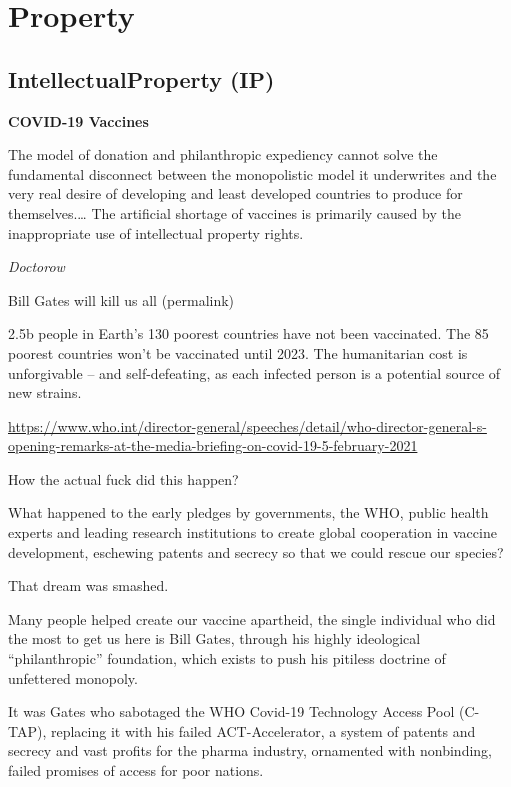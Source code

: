 \documentclass[
]{book}
\begin{document}
\hypertarget{property}{%
\chapter{Property}\label{property}}

\hypertarget{intellectualproperty-ip}{%
\section{IntellectualProperty (IP)}\label{intellectualproperty-ip}}

\textbf{COVID-19 Vaccines}

The model of donation and philanthropic expediency cannot solve the fundamental disconnect between the monopolistic model it underwrites and the very real desire of developing and least developed countries to produce for themselves.\ldots{} The artificial shortage of vaccines is primarily caused by the inappropriate use of intellectual property rights.

\emph{Doctorow}

Bill Gates will kill us all (permalink)

2.5b people in Earth's 130 poorest countries have not been vaccinated. The 85 poorest countries won't be vaccinated until 2023. The humanitarian cost is unforgivable -- and self-defeating, as each infected person is a potential source of new strains.

\url{https://www.who.int/director-general/speeches/detail/who-director-general-s-opening-remarks-at-the-media-briefing-on-covid-19-5-february-2021}

How the actual fuck did this happen?

What happened to the early pledges by governments, the WHO, public health experts and leading research institutions to create global cooperation in vaccine development, eschewing patents and secrecy so that we could rescue our species?

That dream was smashed.

Many people helped create our vaccine apartheid, the single individual who did the most to get us here is Bill Gates, through his highly ideological ``philanthropic'' foundation, which exists to push his pitiless doctrine of unfettered monopoly.

It was Gates who sabotaged the WHO Covid-19 Technology Access Pool (C-TAP), replacing it with his failed ACT-Accelerator, a system of patents and secrecy and vast profits for the pharma industry, ornamented with nonbinding, failed promises of access for poor nations.
\end{document}
